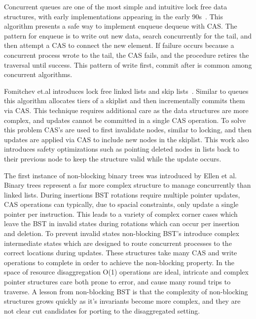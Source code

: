 Concurrent queues are one of the most simple and intuitive lock free data
structures, with early implementations appearing in the early
90s~\cite{simple-fast}. This algorithm presents a safe way to implement enqueue
dequeue with CAS. The pattern for enqueue is to write out new data, search
concurrently for the tail, and then attempt a CAS to connect the new element. If
failure occurs because a concurrent process wrote to the tail, the CAS fails,
and the procedure retires the traversal until success. This pattern of write
first, commit after is common among concurrent algorithms.

Fomitchev et.al introduces lock free linked lists and skip
lists~\cite{lock-free-skip}. Similar to queues this algorithm allocates tiers of
a skiplist and then incrementally commits them via CAS. This technique requires
additional care as the data structures are more complex, and updates cannot be
committed in a single CAS operation. To solve this problem CAS's are used to
first invalidate nodes, similar to locking, and then updates are applied via CAS
to include new nodes in the skiplist. This work also introduces safety
optimizations such as pointing deleted nodes in lists back to their previous
node to keep the structure valid while the update occurs.

The first instance of non-blocking binary trees was introduced by Ellen et al.
Binary trees represent a far more complex structure to manage concurrently than
linked lists. During insertions BST rotations require multiple pointer updates,
CAS operations can typically, due to spacial constraints, only update a single
pointer per instruction. This leads to a variety of complex corner cases which
leave the BST in invalid states during rotations which can occur per insertion
and deletion. To prevent invalid states non-blocking BST's introduce complex
intermediate states which are designed to route concurrent processes to the
correct locations during updates. These structures take many CAS and write
operations to complete in order to achieve the non-blocking property. In the
space of resource disaggregation O(1) operations are ideal, intricate and
complex pointer structures care both prone to error, and cause many round trips
to traverse. A lesson from non-blocking BST is that the complexity of
non-blocking structures grows quickly as it's invariants become more complex,
and they are not clear cut candidates for porting to the disaggregated setting.


